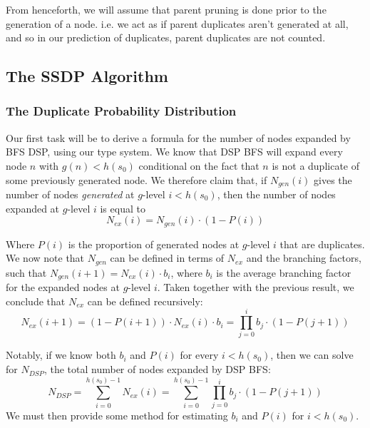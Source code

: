 \documentclass{article}
\begin{document}
From henceforth, we will assume that parent pruning is done prior to the generation of a node.
i.e. we act as if parent duplicates aren't generated at all,
and so in our prediction of duplicates, parent duplicates are not counted.

\subsection{The SSDP Algorithm}

\subsubsection*{The Duplicate Probability Distribution}

Our first task will be to derive a formula for the number of nodes
expanded by BFS DSP, using our type system.
We know that DSP BFS will expand every node \(n\) with \(g(n) < h(s_0)\)
conditional on the fact that \(n\) is not a duplicate of some previously generated node.
We therefore claim that, if \(N_{gen}(i)\) gives the number of nodes \textit{generated}
at \(g\)-level \(i < h(s_0)\), then the number of nodes expanded at \(g\)-level \(i\) is equal to
\[N_{ex}(i) = N_{gen}(i) \cdot (1 - P(i))\]

Where \(P(i)\) is the proportion of generated nodes at \(g\)-level \(i\) that
are duplicates.
We now note that \(N_{gen}\) can be defined in terms of \(N_{ex}\) and
the branching factors, such that
\(N_{gen}(i+1) = N_{ex}(i) \cdot b_i\),
where \(b_i\) is the average branching factor for the expanded nodes at \(g\)-level \(i\).
Taken together with the previous result, we conclude that \(N_{ex}\) can be defined recursively:
\[N_{ex}(i + 1) = (1 - P(i+1)) \cdot  N_{ex}(i) \cdot b_i = \prod_{j=0}^i b_j \cdot (1 - P(j+1))\]

Notably, if we know both \(b_i\) and \(P(i)\) for every \(i < h(s_0)\),
then we can solve for \(N_{DSP}\), the total number of nodes expanded by DSP BFS:
\[N_{DSP} = \sum_{i=0}^{h(s_0) - 1} N_{ex}(i) = \sum_{i=0}^{h(s_0) - 1} \prod_{j=0}^i b_j \cdot (1 - P(j+1))\]
We must then provide some method for estimating \(b_i\) and \(P(i)\) for
\(i < h(s_0)\). \\
\end{document}
